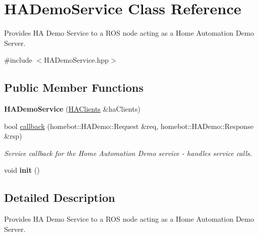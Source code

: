 \hypertarget{classHADemoService}{\section{H\-A\-Demo\-Service Class Reference}
\label{classHADemoService}
}


Provides H\-A Demo Service to a R\-O\-S node acting as a Home Automation Demo Server.  




{\ttfamily \#include $<$H\-A\-Demo\-Service.\-hpp$>$}

\subsection*{Public Member Functions}
\begin{DoxyCompactItemize}
\item 
\hypertarget{classHADemoService_ab811f36a7568e3db91376b9c020aa479}{{\bfseries H\-A\-Demo\-Service} (\hyperlink{classHAClients}{H\-A\-Clients} \&ha\-Clients)}\label{classHADemoService_ab811f36a7568e3db91376b9c020aa479}

\item 
bool \hyperlink{classHADemoService_ab774121c439c8787271da8184a11abf3}{callback} (homebot\-::\-H\-A\-Demo\-::\-Request \&req, homebot\-::\-H\-A\-Demo\-::\-Response \&rsp)
\begin{DoxyCompactList}\small\item\em Service callback for the Home Automation Demo service -\/ handles service calls. \end{DoxyCompactList}\item 
\hypertarget{classHADemoService_ab5ed73d4c2557de8f43c5aefdd5a2796}{void {\bfseries init} ()}\label{classHADemoService_ab5ed73d4c2557de8f43c5aefdd5a2796}

\end{DoxyCompactItemize}


\subsection{Detailed Description}
Provides H\-A Demo Service to a R\-O\-S node acting as a Home Automation Demo Server. 

